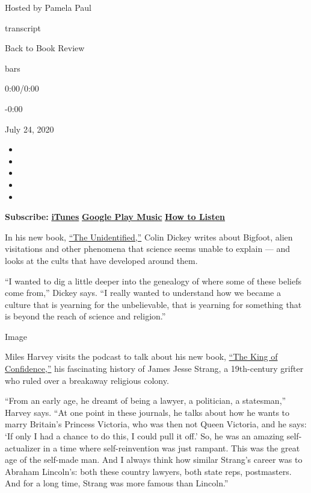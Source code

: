 Hosted by Pamela Paul

transcript

Back to Book Review

bars

0:00/0:00

-0:00

July 24, 2020

\begin{itemize}
\item
\item
\item
\item
\item
\end{itemize}

\textbf{Subscribe:}
\textbf{\href{https://itunes.apple.com/us/podcast/book-review/id120315179?mt=2}{iTunes}}
\textbf{\textbar{}}
\textbf{\href{https://play.google.com/music/listen?u=0\#/ps/Iv6zeb5qwjtzjfbyo3vy5zny5ky}{Google
Play Music}} \textbf{\textbar{}}
\textbf{\href{https://www.nytimes3xbfgragh.onion/2018/08/03/books/review/how-to-listen-to-the-book-review-podcast.html}{How
to Listen}}

In his new book,
\href{https://www.nytimes3xbfgragh.onion/2020/07/21/books/review/the-unidentified-colin-dickey.html}{``The
Unidentified,''} Colin Dickey writes about Bigfoot, alien visitations
and other phenomena that science seems unable to explain --- and looks
at the cults that have developed around them.

``I wanted to dig a little deeper into the genealogy of where some of
these beliefs come from,'' Dickey says. ``I really wanted to understand
how we became a culture that is yearning for the unbelievable, that is
yearning for something that is beyond the reach of science and
religion.''

Image

Miles Harvey visits the podcast to talk about his new book,
\href{https://www.nytimes3xbfgragh.onion/2020/07/14/books/review/king-of-confidence-miles-harvey-james-jesse-strang.html}{``The
King of Confidence,''} his fascinating history of James Jesse Strang, a
19th-century grifter who ruled over a breakaway religious colony.

``From an early age, he dreamt of being a lawyer, a politician, a
statesman,'' Harvey says. ``At one point in these journals, he talks
about how he wants to marry Britain's Princess Victoria, who was then
not Queen Victoria, and he says: `If only I had a chance to do this, I
could pull it off.' So, he was an amazing self-actualizer in a time
where self-reinvention was just rampant. This was the great age of the
self-made man. And I always think how similar Strang's career was to
Abraham Lincoln's: both these country lawyers, both state reps,
postmasters. And for a long time, Strang was more famous than Lincoln.''

